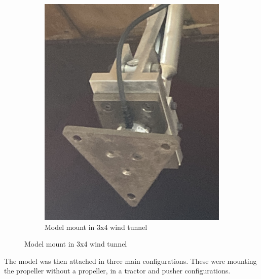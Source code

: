 \begin{figure}[H]
    \hfill
    \begin{subfigure}[b]{0.3\textwidth}
        \centering
        \includegraphics[scale=0.1]{04_Methodology/Figs/mount}
        \caption{Model mount in 3x4 wind tunnel}
        \label{fig:LoadCellb}
    \end{subfigure}
    \hfill
    
\end{figure}


The model was then attached in three main configurations. These were mounting the propeller without a propeller, in a tractor and pusher configurations.


